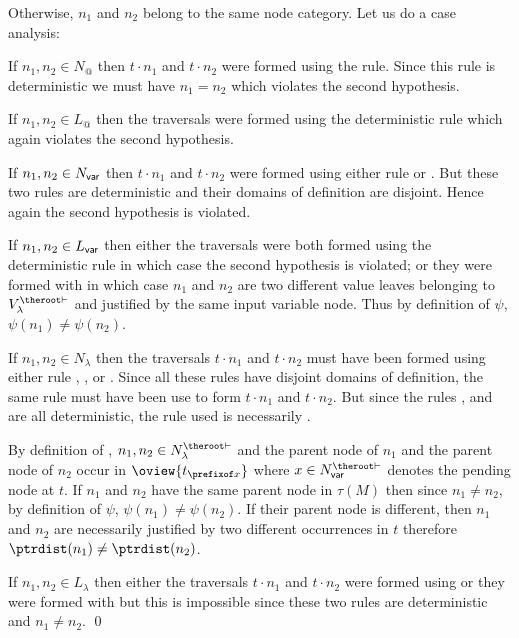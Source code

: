 Otherwise, $n_1$ and $n_2$ belong to the same node category. Let us
do a case analysis:
\begin{compactitem}
\item If $n_1, n_2 \in N_@$ then $t
\cdot n_1$ and $t \cdot n_2$ were formed using the 
rule. Since this rule is deterministic we must have $n_1=n_2$ which
violates the second hypothesis.

\item If $n_1, n_2 \in L_@$ then the traversals were formed using the deterministic rule
 which again violates the
second hypothesis.

\item If $n_1,n_2\in N_{\sf var}$ then
     $t \cdot n_1$ and $t \cdot n_2$ were formed using either rule  or .
     But these two rules are deterministic and their domains of definition are disjoint. Hence again the second
     hypothesis is violated.

\item If  $n_1, n_2 \in L_{\sf var}$ then either the traversals were both formed using the deterministic rule
 in which case the
second hypothesis is violated; or they were formed with
 in which case $n_1$ and $n_2$ are two
different value leaves belonging to $V^{\theroot\vdash}_\lambda$ and
justified by the same input variable node. Thus by definition of
$\psi$, $\psi(n_1)\neq\psi(n_2)$.

\item If  $n_1,n_2\in N_\lambda$ then the traversals $t \cdot n_1$
    and $t \cdot n_2$ must have been formed using either rule
    , ,  or . Since all these rules have
    disjoint domains of definition, the same rule must have been use to
    form $t \cdot n_1$ and $t \cdot n_2$.
    But since the rules ,  and  are all deterministic,
    the rule used is necessarily .

    By definition of , $n_1,n_2\in N_\lambda^{\theroot\vdash}$ and the parent node of $n_1$ and the parent node of $n_2$  occur in  $\oview{t_{\prefixof x}}$ where $x \in N^{\theroot\vdash}_{\sf var}$
    denotes the pending node at $t$. If $n_1$ and $n_2$ have the same
    parent node in $\tau(M)$ then since $n_1\neq n_2$, by definition of
    $\psi$, $\psi(n_1)\neq \psi(n_2)$. If their parent node is
    different, then $n_1$ and $n_2$ are necessarily justified by two different
    occurrences in $t$ therefore $\ptrdist(n_1) \neq \ptrdist(n_2)$.

\item If  $n_1,n_2\in L_\lambda$ then either the traversals $t \cdot n_1$
    and $t \cdot n_2$ were formed using
     or they were formed with
     but this is impossible since these two rules are
    deterministic and $n_1 \neq n_2$. \qed
\end{compactitem}




